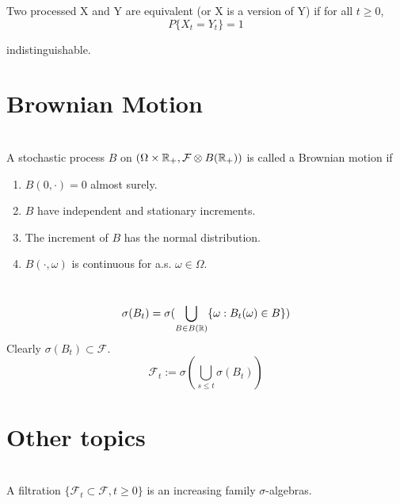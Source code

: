 \documentclass[12pt]{book}
\begin{document}
\begin{definition}
Two processed X and Y are equivalent (or X is a version of Y) if for all $t\geq 0$,
$$
P\{X_t=Y_t\}=1
$$	
\end{definition}
indistinguishable.
\begin{theorem}
	
\end{theorem}
\section{Brownian Motion}
\begin{definition} \ \\
A stochastic process $B$ on $(\Omega \times \mathbb{R}_+, \mathcal F \otimes B(\mathbb{R}_+))$ is called a Brownian motion if 
\begin{enumerate}
  \item $B(0,\cdot)=0$ almost surely.
  \item $B$ have independent and stationary increments.
  \item The increment of $B$ has the normal distribution.
  \item $B(\cdot,\omega)$ is continuous for a.s. $\omega\in \Omega$.
\end{enumerate}
\end{definition}

\begin{definition} \ \\
$$
\sigma(B_t) = \sigma(\bigcup_{B \in B(\mathbb{R})}\{\omega:B_t(\omega)\in B\})
$$
Clearly $\sigma(B_t) \subset \mathcal F$.
$$
\mathcal{F}_t := \sigma(\bigcup_{s\leq t}\sigma(B_t))
$$
\end{definition}


\begin{theorem}
	
\end{theorem}

\section{Other topics}
\begin{definition}[Filtration] \ \\
A filtration $\{\mathcal{F}_t\subset \mathcal{F},t \geq 0\}$ is an increasing family $\sigma$-algebras.
	
\end{definition}
\end{document}
